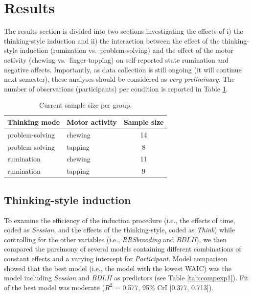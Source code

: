 \documentclass[a4paper,12pt,twoside,openright,oldfontcommands,final]{memoir}
\begin{document}
\hypertarget{results-4}{%
\section{Results}\label{results-4}}

The results section is divided into two sections investigating the effects of i) the thinking-style induction and ii) the interaction between the effect of the thinking-style induction (rumination vs.~problem-solving) and the effect of the motor activity (chewing vs.~finger-tapping) on self-reported state rumination and negative affects. Importantly, as data collection is still ongoing (it will continue next semester), these analyses should be considered as \emph{very preliminary}. The number of observations (participants) per condition is reported in Table \ref{tab:sampleszize}.

\begin{table}[H]
\begin{center}
\begin{threeparttable}
\caption{\label{tab:sampleszize}Current sample size per group.}
\begin{tabular}{llc}
\toprule
Thinking mode & Motor activity & Sample size\\
\midrule
problem-solving & chewing & 14\\
problem-solving & tapping & 8\\
rumination & chewing & 11\\
rumination & tapping & 9\\
\bottomrule
\end{tabular}
\end{threeparttable}
\end{center}
\end{table}

\hypertarget{thinking-style-induction-1}{%
\subsection{Thinking-style induction}\label{thinking-style-induction-1}}

To examine the efficiency of the induction procedure (i.e., the effects of time, coded as \emph{Session}, and the effects of the thinking-style, coded as \emph{Think}) while controlling for the other variables (i.e., \emph{RRSbrooding} and \emph{BDI.II}), we then compared the parsimony of several models containing different combinations of constant effects and a varying intercept for \emph{Participant}. Model comparison showed that the best model (i.e., the model with the lowest WAIC) was the model including \emph{Session} and \emph{BDI.II} as predictors (see Table \ref{tab:compexp1}). Fit of the best model was moderate (\(R^2\) = 0.577, 95\% CrI {[}0.377, 0.713{]}).
\end{document}
